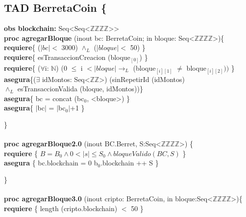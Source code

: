 \documentclass{article}
\newcommand{\Entero}{$\mathds{Z}$}
\newcommand{\Natural}{$\mathds{N}$}
\newcommand{\tuplaDeDosEnteros}{Seq\textless\Entero\texttimes\Entero\textgreater}
\newcommand{\tuplaDeCuatroEnteros}{Seq\textless\Entero\texttimes\Entero\texttimes\Entero\texttimes\Entero\textgreater}
\newcommand{\tuplaDeTuplaDeCuatroEnteros}{{Seq\textless Seq\textless\Entero\texttimes\Entero\texttimes\Entero\texttimes\Entero\textgreater\textgreater}}
\begin{document}
\thispagestyle{empty}

\newpage %
\setcounter{page}{1}
\subsection*{TAD \textdollar BerretaCoin \{}
    \textbf{obs blockchain:} \tuplaDeTuplaDeCuatroEnteros\\

    \textbf{proc agregarBloque} (inout bc: \textdollar BerretaCoin;
                                in bloque: \tuplaDeCuatroEnteros)\{
        \indent\indent \textbf{requiere}\{ ($|bc|<$ 3000) $\land_L$ ($|bloque|<$ 50) \}\\

        \indent\indent \textbf{requiere}\{ esTransaccionCreacion (bloque$_{[0]}$) \}\\

        \indent\indent \textbf{requiere}\{ ($\forall$i: \Natural)
                                (0 $\leq$ i $<|bloque| \rightarrow_L$ (bloque$_{[i][1]}$ $\neq$ bloque$_{[i][2]}))$ \}\\

        \indent\indent \textbf{asegura}\{($\exists$ idMontos: \tuplaDeDosEnteros) (sinRepetirId (idMontos)\\
        \indent\indent\indent\indent\indent $\land_L$ esTransaccionValida (bloque, idMontos))\}\\

        \indent\indent \textbf{asegura}\{ bc = concat (bc$_0$, \textless bloque\textgreater) \}\\

        \indent\indent \textbf{asegura}\{ $|$bc$|$ = $|$bc$_0|$+1 \}

    \}\\\\

    \textbf{proc agregarBloque2.0} (inout BC.Berret\@, S:\tuplaDeCuatroEnteros) \{\\
        \indent\indent\textbf{requiere} \{ $B = B_0 \land 0 < |s| \leq S_0 \land bloqueValido(BC, S)$ \}\\

        \indent\indent\textbf{asegura} \{ bc.blockchain = 0 b${_0}$.blockchain ++ S \}

    \}\\\\

    \textbf{proc agregarBloque3.0} (inout cripto: BerretaCoin, in bloque:\tuplaDeCuatroEnteros)\{\\
        \indent\indent\textbf{requiere} \{ length (cripto.blockchain) $<$ 50 \}\\
\end{document}
